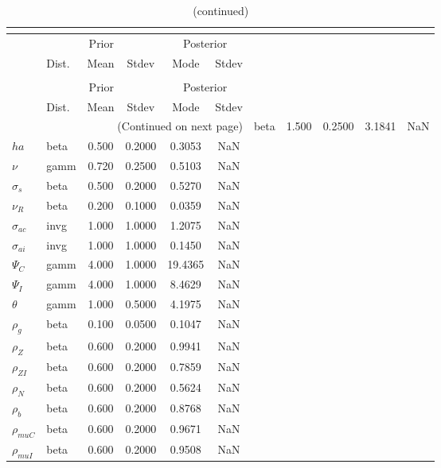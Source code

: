  
\begin{center}
\begin{longtable}{llcccc} 
\caption{Results from posterior maximization (parameters)}\\
 \label{Table:Posterior:1}\\
\toprule 
  & \multicolumn{3}{c}{Prior}  &  \multicolumn{2}{c}{Posterior} \\
  \cmidrule(r{.75em}){2-4} \cmidrule(r{.75em}){5-6}
  & Dist. & Mean  & Stdev & Mode & Stdev \\ 
\midrule \endfirsthead 
\caption{(continued)}\\
 \bottomrule 
  & \multicolumn{3}{c}{Prior}  &  \multicolumn{2}{c}{Posterior} \\
  \cmidrule(r{.75em}){2-4} \cmidrule(r{.75em}){5-6}
  & Dist. & Mean  & Stdev & Mode & Stdev \\ 
\midrule \endhead 
\bottomrule \multicolumn{6}{r}{(Continued on next page)}\endfoot 
\bottomrule\endlastfoot 
${\gamma}$ & beta &   1.500 & 0.2500 &   3.1841 &     NaN \\ 
${ha}$ & beta &   0.500 & 0.2000 &   0.3053 &     NaN \\ 
$\nu$ & gamm &   0.720 & 0.2500 &   0.5103 &     NaN \\ 
$\sigma_s$ & beta &   0.500 & 0.2000 &   0.5270 &     NaN \\ 
${\nu_R}$ & beta &   0.200 & 0.1000 &   0.0359 &     NaN \\ 
${\sigma_{ac}}$ & invg &   1.000 & 1.0000 &   1.2075 &     NaN \\ 
${\sigma_{ai}}$ & invg &   1.000 & 1.0000 &   0.1450 &     NaN \\ 
${\Psi_C}$ & gamm &   4.000 & 1.0000 &  19.4365 &     NaN \\ 
${\Psi_I}$ & gamm &   4.000 & 1.0000 &   8.4629 &     NaN \\ 
${\theta}$ & gamm &   1.000 & 0.5000 &   4.1975 &     NaN \\ 
${\rho_g}$ & beta &   0.100 & 0.0500 &   0.1047 &     NaN \\ 
${\rho_Z}$ & beta &   0.600 & 0.2000 &   0.9941 &     NaN \\ 
${\rho_{ZI}}$ & beta &   0.600 & 0.2000 &   0.7859 &     NaN \\ 
${\rho_N}$ & beta &   0.600 & 0.2000 &   0.5624 &     NaN \\ 
${\rho_b}$ & beta &   0.600 & 0.2000 &   0.8768 &     NaN \\ 
${\rho_{muC}}$ & beta &   0.600 & 0.2000 &   0.9671 &     NaN \\ 
${\rho_{muI}}$ & beta &   0.600 & 0.2000 &   0.9508 &     NaN \\ 
\end{longtable}
 \end{center}
